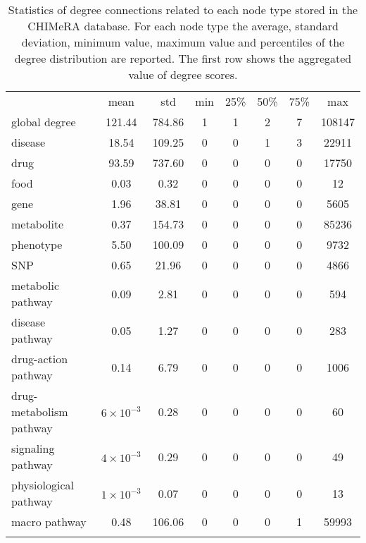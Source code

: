 \documentclass{standalone}
\begin{document}
\begin{table}
\centering
\begin{tabular}{lccccccc}
\hline\rowcolor{darkgrayrow}
                        & mean            &  std    &  min & 25\% & 50\% & 75\% &   max  \\
global degree           & 121.44          &  784.86 &    1 &    1 &    2 &    7 & 108147 \\
disease                 &  18.54          &  109.25 &    0 &    0 &    1 &    3 &  22911 \\
drug                    &  93.59          &  737.60 &    0 &    0 &    0 &    0 &  17750 \\
food                    &   0.03          &    0.32 &    0 &    0 &    0 &    0 &     12 \\
gene                    &   1.96          &   38.81 &    0 &    0 &    0 &    0 &   5605 \\
metabolite              &   0.37          &  154.73 &    0 &    0 &    0 &    0 &  85236 \\
phenotype               &   5.50          &  100.09 &    0 &    0 &    0 &    0 &   9732 \\
SNP                     &   0.65          &   21.96 &    0 &    0 &    0 &    0 &   4866 \\
metabolic pathway       &   0.09          &    2.81 &    0 &    0 &    0 &    0 &    594 \\
disease pathway         &   0.05          &    1.27 &    0 &    0 &    0 &    0 &    283 \\
drug-action pathway     &   0.14          &    6.79 &    0 &    0 &    0 &    0 &   1006 \\
drug-metabolism pathway &$6\times10^{-3}$ &    0.28 &    0 &    0 &    0 &    0 &     60 \\
signaling pathway       &$4\times10^{-3}$ &    0.29 &    0 &    0 &    0 &    0 &     49 \\
physiological pathway   &$1\times10^{-3}$ &    0.07 &    0 &    0 &    0 &    0 &     13 \\
macro pathway           &   0.48          &  106.06 &    0 &    0 &    0 &    1 &  59993 \\
\hline\\
\end{tabular}
\caption{Statistics of degree connections related to each node type stored in the \textsf{CHIMeRA} database.
For each node type the average, standard deviation, minimum value, maximum value and percentiles of the degree distribution are reported.
The first row shows the aggregated value of degree scores.
}
\label{tab:chimera_degree}
\end{table}
\end{document}
